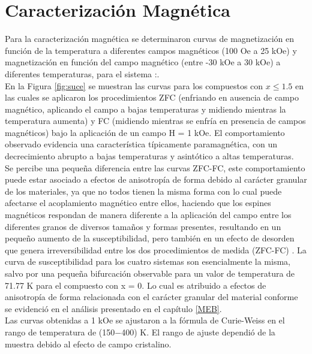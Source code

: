 \chapter{Caracterización Magnética}

Para la caracterización magnética se determinaron curvas de magnetización en
función de la temperatura a diferentes campos magnéticos (100 Oe a 25 kOe) y
magnetización en función del campo magnético (entre -30 kOe a 30 kOe) a
diferentes temperaturas, para el sistema
:.\\

En la Figura \ref{fig:suce} se muestran las curvas para los compuestos con $x\leq 1.5$
en las
cuales se aplicaron los procedimientos ZFC (enfriando en ausencia de campo
magnético, aplicando el campo a bajas temperaturas y midiendo mientras la
temperatura aumenta) y FC (midiendo mientras se enfría en presencia de campos
magnéticos) bajo la aplicación de un campo H = 1 kOe. El comportamiento
observado evidencia una característica típicamente paramagnética, con un
decrecimiento abrupto a bajas temperaturas y asintótico a altas temperaturas.\\

Se percibe una pequeña diferencia entre las curvas ZFC-FC, este
comportamiento puede estar asociado a efectos de anisotropía de forma debido al
carácter granular de los materiales, ya que no todos tienen la misma forma con
lo cual puede afectarse el acoplamiento magnético entre ellos, haciendo que los
espines magnéticos respondan de manera diferente a la aplicación del campo
entre los diferentes granos de diversos tamaños y formas presentes, resultando
en un pequeño aumento de la susceptibilidad, pero también en un efecto de
desorden que genera irreversibilidad entre los dos procedimientos de medida
(ZFC-FC) \cite{bustos2018analisis}. La curva de susceptibilidad para los cuatro sistemas son
esencialmente la misma, salvo por una pequeña bifurcación observable para un
valor de temperatura de 71.77 K para el compuesto con x = 0. Lo cual es
atribuido a efectos de anisotropía de forma relacionada con el carácter
granular del material conforme se evidenció en el análisis presentado en el capítulo
\ref{MEB}.\\

Las curvas obtenidas a 1 kOe se ajustaron a la fórmula de Curie-Weiss en el
rango de temperatura de (150$-$400) K. El rango de ajuste dependió de la muestra
debido al efecto de campo cristalino.\\

